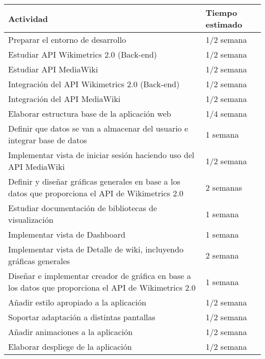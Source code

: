 \begin{tabular}{ |p{8cm}|p{4cm}|}
 \hline
 \textbf{Actividad} & \textbf{Tiempo estimado}\\
 \hline
 Preparar el entorno de desarrollo & 1/2 semana\\
 \hline
 Estudiar API Wikimetrics 2.0 (Back-end) & 1/2 semana\\
 \hline
 Estudiar API MediaWiki & 1/2 semana\\
 \hline
 Integración del API Wikimetrics 2.0 (Back-end) & 1/2 semana\\
 \hline
 Integración del API MediaWiki & 1/2 semana\\
 \hline
 Elaborar estructura base de la aplicación web & 1/4 semana\\
 \hline
 Definir que datos se van a almacenar del usuario e integrar base de datos & 1 semana\\
 \hline
 Implementar vista de iniciar sesión haciendo uso del API MediaWiki & 1/2 semana\\
 \hline
 Definir y diseñar gráficas generales en base a los datos que proporciona el API de Wikimetrics 2.0 & 2 semanas\\
 \hline
 Estudiar documentación de bibliotecas de visualización & 1 semana\\
 \hline
 Implementar vista de Dashboard & 1 semana\\
 \hline
 Implementar vista de Detalle de wiki, incluyendo gráficas generales & 2 semana\\
 \hline
 Diseñar e implementar creador de gráfica en base a los datos que proporciona el API de Wikimetrics 2.0 & 1 semana\\
 \hline
 Añadir estilo apropiado a la aplicación & 1/2 semana\\
 \hline
 Soportar adaptación a distintas pantallas & 1/2 semana\\
 \hline
 Añadir animaciones a la aplicación & 1/2 semana\\
 \hline
 Elaborar despliege de la aplicación & 1/2 semana\\
 \hline
\end{tabular}